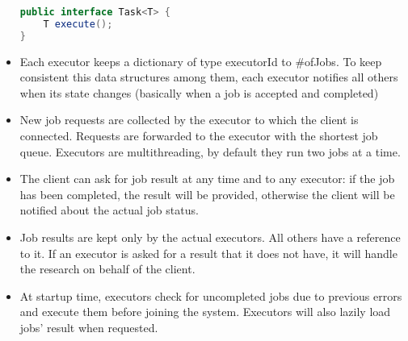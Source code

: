 \documentclass{article}
\begin{document}
\begin{itemize}
\begin{file}
\begin{lstlisting}[language=Java]
public interface Task<T> {
    T execute();
}
\end{lstlisting}
\end{file}
	\item Each executor keeps a dictionary of type executorId to \#ofJobs. To keep consistent this data structures among them, each executor notifies all others when its state changes (basically when a job is accepted and completed)
	\item New job requests are collected by the executor to which the client is connected. Requests are forwarded to the executor with the shortest job queue. Executors are multithreading, by default they run two jobs at a time.
	\item The client can ask for job result at any time and to any executor: if the job has been completed, the result will be provided, otherwise the client will be notified about the actual job status.
	\item Job results are kept only by the actual executors. All others have a reference to it. If an executor is asked for a result that it does not have, it will handle the research on behalf of the client.
	\item At startup time, executors check for uncompleted jobs due to previous errors and execute them before joining the system. Executors will also lazily load jobs' result when requested.

		
\end{itemize}
\end{document}
